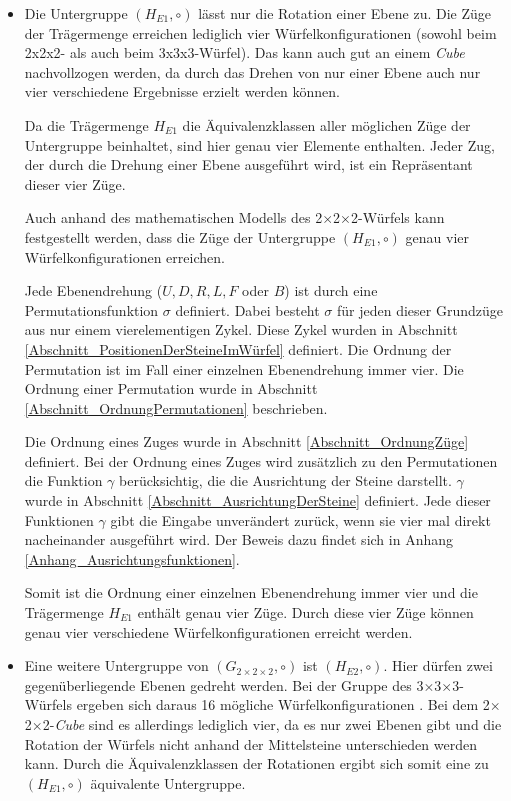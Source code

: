 \documentclass[12pt,a4paper, usenames, dvipsnames]{article}
\theoremstyle{mystyle}
\theoremstyle{definition}
\newcommand{\Gtwo}{\ensuremath{G_{2\times 2\times 2}}}
\newcommand{\Ttwo}{2$\times$2$\times$2-}
\newcommand{\Tthree}{3$\times$3$\times$3-}
\begin{document}
\begin{itemize}
\item Die Untergruppe $(H_{E1}, \circ)$ lässt nur die Rotation einer Ebene zu. Die Züge der Trägermenge erreichen lediglich vier Würfelkonfigurationen (sowohl beim 2x2x2- als auch beim 3x3x3-Würfel). Das kann auch gut an einem \textit{Cube} nachvollzogen werden, da durch das Drehen von nur einer Ebene auch nur vier verschiedene Ergebnisse erzielt werden können.

Da die Trägermenge $H_{E1}$ die Äquivalenzklassen aller möglichen Züge der Untergruppe beinhaltet, sind hier genau vier Elemente enthalten. Jeder Zug, der durch die Drehung einer Ebene ausgeführt wird, ist ein Repräsentant dieser vier Züge.

Auch anhand des mathematischen Modells des \Ttwo Würfels kann festgestellt werden, dass die Züge der Untergruppe $(H_{E1}, \circ)$ genau vier Würfelkonfigurationen erreichen.

Jede Ebenendrehung ($U, D, R, L, F$ oder $B$) ist durch eine Permutationsfunktion $\sigma$ definiert. Dabei besteht $\sigma$ für jeden dieser Grundzüge aus nur einem vierelementigen Zykel. Diese Zykel wurden in Abschnitt \ref{Abschnitt_PositionenDerSteineImWürfel} definiert. Die Ordnung der Permutation ist im Fall einer einzelnen Ebenendrehung immer vier. Die Ordnung einer Permutation wurde in Abschnitt \ref{Abschnitt_OrdnungPermutationen} beschrieben.

Die Ordnung eines Zuges wurde in Abschnitt \ref{Abschnitt_OrdnungZüge} definiert. Bei der Ordnung eines Zuges wird zusätzlich zu den Permutationen die Funktion $\gamma$ berücksichtig, die die Ausrichtung der Steine darstellt. $\gamma$ wurde in Abschnitt \ref{Abschnitt_AusrichtungDerSteine} definiert. Jede dieser Funktionen $\gamma$ gibt die Eingabe unverändert zurück, wenn sie vier mal direkt nacheinander ausgeführt wird. Der Beweis dazu findet sich in Anhang \ref{Anhang_Ausrichtungsfunktionen}. 

Somit ist die Ordnung einer einzelnen Ebenendrehung immer vier und die Trägermenge $H_{E1}$ enthält genau vier Züge. Durch diese vier Züge können genau vier verschiedene Würfelkonfigurationen erreicht werden. 



\item Eine weitere Untergruppe von $(\Gtwo, \circ)$ ist $(H_{E2}, \circ)$. Hier dürfen zwei gegenüber\-liegende Ebenen gedreht werden. 
Bei der Gruppe des \Tthree Würfels ergeben sich daraus 16 mögliche Würfelkonfigurationen \cite{TD}. Bei dem \Ttwo \textit{Cube} sind es allerdings lediglich vier, da es nur zwei Ebenen gibt und die Rotation der Würfels nicht anhand der Mittelsteine unterschieden werden kann. Durch die Äquivalenzklassen der Rotationen ergibt sich somit eine zu $(H_{E1}, \circ)$ äquivalente Untergruppe.
\end{itemize}
\end{document}
